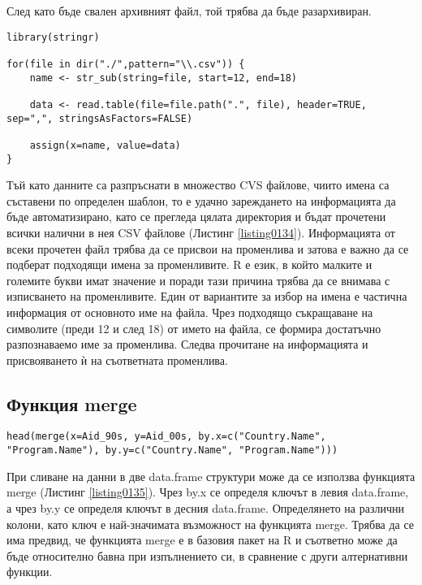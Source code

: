 След като бъде свален архивният файл, той трябва да бъде разархивиран.

\begin{lstlisting}[caption=Зареждане USAID данните в R, label=listing0134]
library(stringr)

for(file in dir("./",pattern="\\.csv")) {
	name <- str_sub(string=file, start=12, end=18)

	data <- read.table(file=file.path(".", file), header=TRUE, sep=",", stringsAsFactors=FALSE)

	assign(x=name, value=data)
}
\end{lstlisting}

Тъй като данните са разпръснати в множество CVS файлове, чиито имена са съставени по определен шаблон, то е удачно зареждането на информацията да бъде автоматизирано, като се прегледа цялата директория и бъдат прочетени всички налични в нея CSV файлове (Листинг \ref{listing0134}). Информацията от всеки прочетен файл трябва да се присвои на променлива и затова е важно да се подберат подходящи имена за променливите. R е език, в който малките и големите букви имат значение и поради тази причина трябва да се внимава с изписването на променливите. Един от вариантите за избор на имена е частична информация от основното име на файла. Чрез подходящо съкращаване на символите (преди 12 и след 18) от името на файла, се формира достатъчно разпознаваемо име за променлива. Следва прочитане на информацията и присвояването ѝ на съответната променлива.

\subsection{Функция merge}

\begin{lstlisting}[caption=Сливане на данни с merge, label=listing0135]
head(merge(x=Aid_90s, y=Aid_00s, by.x=c("Country.Name", "Program.Name"), by.y=c("Country.Name", "Program.Name")))
\end{lstlisting}

При сливане на данни в две data.frame структури може да се използва функцията merge (Листинг \ref{listing0135}). Чрез by.x се определя ключът в левия data.frame, а чрез by.y се определя ключът в десния data.frame. Определянето на различни колони, като ключ е най-значимата възможност на функцията merge. Трябва да се има предвид, че функцията merge е в базовия пакет на R и съответно може да бъде относително бавна при изпълнението си, в сравнение с други алтернативни функции.

